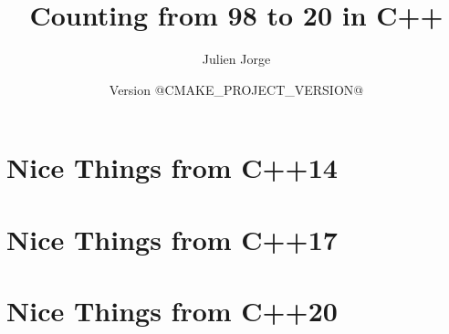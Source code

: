 \documentclass{book}
\title{Counting from 98 to 20 in C++}
\author{Julien Jorge}
\date{Version @CMAKE_PROJECT_VERSION@}
\begin{document}
\maketitle

\tableofcontents

\frontmatter

\mainmatter




\chapter{Nice Things from C++14}
\chapter{Nice Things from C++17}
\chapter{Nice Things from C++20}



\end{document}
